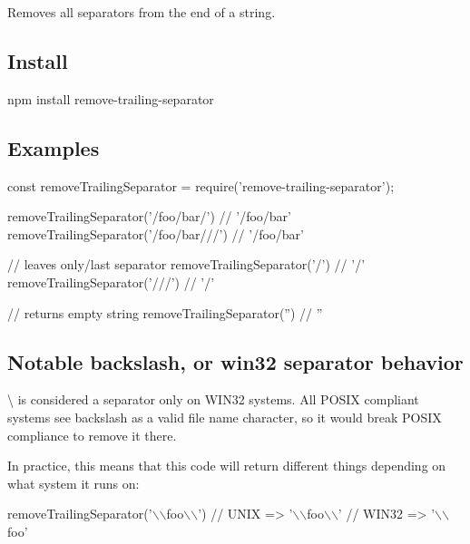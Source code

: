 \href{https://npmjs.org/package/remove-trailing-separator}{\tt } \href{https://travis-ci.org/darsain/remove-trailing-separator}{\tt } \href{https://ci.appveyor.com/project/darsain/remove-trailing-separator/branch/master}{\tt } \href{https://coveralls.io/github/darsain/remove-trailing-separator?branch=master}{\tt }

Removes all separators from the end of a string.

\subsection*{Install}


\begin{DoxyCode}
npm install remove-trailing-separator
\end{DoxyCode}


\subsection*{Examples}


\begin{DoxyCode}
const removeTrailingSeparator = require('remove-trailing-separator');

removeTrailingSeparator('/foo/bar/')   // '/foo/bar'
removeTrailingSeparator('/foo/bar///') // '/foo/bar'

// leaves only/last separator
removeTrailingSeparator('/')    // '/'
removeTrailingSeparator('///')  // '/'

// returns empty string
removeTrailingSeparator('') // ''
\end{DoxyCode}


\subsection*{Notable backslash, or win32 separator behavior}

{\ttfamily \textbackslash{}} is considered a separator only on W\+I\+N32 systems. All P\+O\+S\+IX compliant systems see backslash as a valid file name character, so it would break P\+O\+S\+IX compliance to remove it there.

In practice, this means that this code will return different things depending on what system it runs on\+:


\begin{DoxyCode}
removeTrailingSeparator('\(\backslash\)\(\backslash\)foo\(\backslash\)\(\backslash\)')
// UNIX  => '\(\backslash\)\(\backslash\)foo\(\backslash\)\(\backslash\)'
// WIN32 => '\(\backslash\)\(\backslash\)foo'
\end{DoxyCode}
 